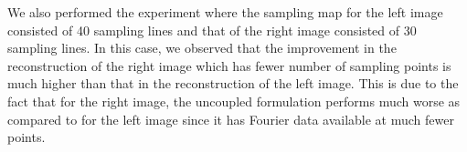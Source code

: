 We also performed the experiment where the sampling map for the left image consisted of 40 sampling lines and that of the right image consisted of 30 sampling lines. In this case, we observed that the improvement in the reconstruction of the right image which has fewer number of sampling points is much higher than that in the reconstruction of the left image. This is due to the fact that for the right image, the uncoupled formulation performs much worse as compared to for the left image since it has Fourier data available at much fewer points.
%
%
%
%
%
%
